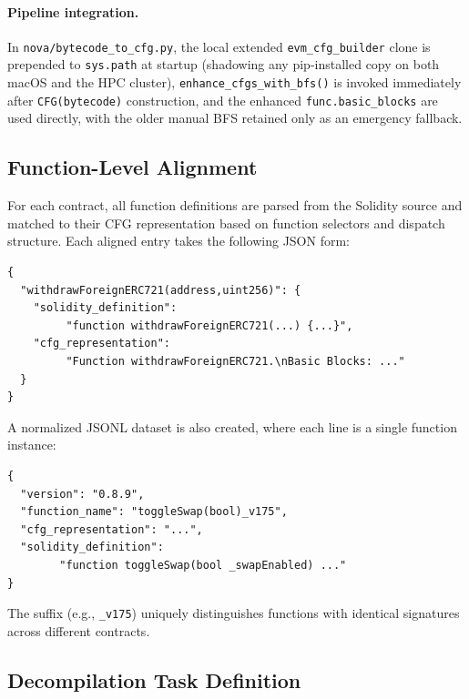 \documentclass{stylefiles/capstone}
\begin{document}
\paragraph{Pipeline integration.}
In \texttt{nova/bytecode\_to\_cfg.py}, the local extended \texttt{evm\_cfg\_builder}
clone is prepended to \texttt{sys.path} at startup (shadowing any pip-installed
copy on both macOS and the HPC cluster), \texttt{enhance\_cfgs\_with\_bfs()} is
invoked immediately after \texttt{CFG(bytecode)} construction, and the enhanced
\texttt{func.basic\_blocks} are used directly, with the older manual BFS retained
only as an emergency fallback.

\subsection{Function-Level Alignment}

For each contract, all function definitions are parsed from the Solidity source and
matched to their CFG representation based on function selectors and dispatch
structure. Each aligned entry takes the following JSON form:

\noindent\begin{small}
\begin{verbatim}
{
  "withdrawForeignERC721(address,uint256)": {
    "solidity_definition":
         "function withdrawForeignERC721(...) {...}",
    "cfg_representation":
         "Function withdrawForeignERC721.\nBasic Blocks: ..."
  }
}
\end{verbatim}
\end{small}

A normalized JSONL dataset is also created, where each line is a single function
instance:

\noindent\begin{small}
\begin{verbatim}
{
  "version": "0.8.9",
  "function_name": "toggleSwap(bool)_v175",
  "cfg_representation": "...",
  "solidity_definition":
        "function toggleSwap(bool _swapEnabled) ..."
}
\end{verbatim}
\end{small}

The suffix (e.g., \texttt{\_v175}) uniquely distinguishes functions with identical
signatures across different contracts.

\subsection{Decompilation Task Definition}
\end{document}
